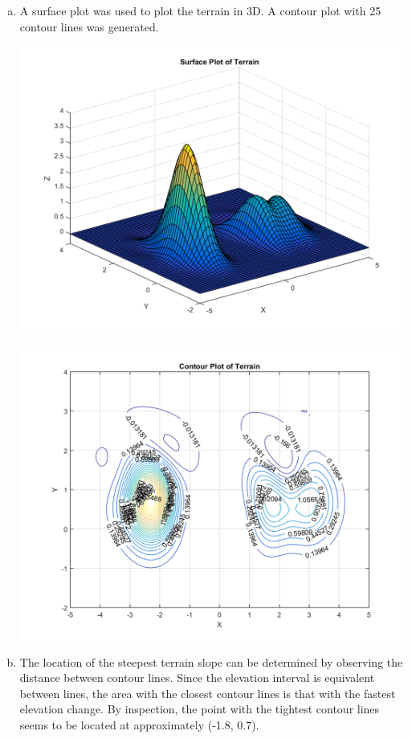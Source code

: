 \documentclass[12pt,onecolumn]{article}
\begin{document}
\begin{enumerate}[a.]
\item  A surface plot was used to plot the terrain in 3D. A contour plot with 25 contour lines was generated.
\begin{center}
	\includegraphics[width=\textwidth]{SurfacePlot}
\end{center}
\begin{center}
	\includegraphics[width=\textwidth]{ContourPlot}
\end{center}

\item The location of the steepest terrain slope can be determined by observing the distance between contour lines. Since the elevation interval is equivalent between lines, the area with the closest contour lines is that with the fastest elevation change. By inspection, the point with the tightest contour lines seems to be located at approximately (-1.8, 0.7).


\end{enumerate}
\end{document}
